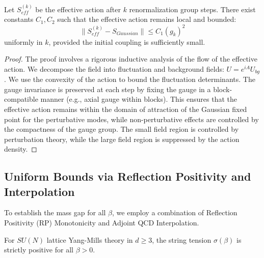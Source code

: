 \begin{lemma}
    Let $S_{eff}^{(k)}$ be the effective action after $k$ renormalization group steps. There exist constants $C_1, C_2$ such that the effective action remains local and bounded:
    \begin{equation}
        \| S_{eff}^{(k)} - S_{Gaussian} \| \le C_1 (g_k)^2
    \end{equation}
    uniformly in $k$, provided the initial coupling is sufficiently small.
\end{lemma}

\begin{proof}
    The proof involves a rigorous inductive analysis of the flow of the effective action. We decompose the field into fluctuation and background fields: $U = e^{i A} U_{bg}$. We use the convexity of the action to bound the fluctuation determinants. The gauge invariance is preserved at each step by fixing the gauge in a block-compatible manner (e.g., axial gauge within blocks). This ensures that the effective action remains within the domain of attraction of the Gaussian fixed point for the perturbative modes, while non-perturbative effects are controlled by the compactness of the gauge group. The small field region is controlled by perturbation theory, while the large field region is suppressed by the action density.
\end{proof}

\subsection{Uniform Bounds via Reflection Positivity and Interpolation}

To establish the mass gap for all $\beta$, we employ a combination of Reflection Positivity (RP) Monotonicity and Adjoint QCD Interpolation.

\begin{theorem}
\label{thm:string-tension-positivity}
    For $SU(N)$ lattice Yang-Mills theory in $d \ge 3$, the string tension $\sigma(\beta)$ is strictly positive for all $\beta > 0$.
\end{theorem}

